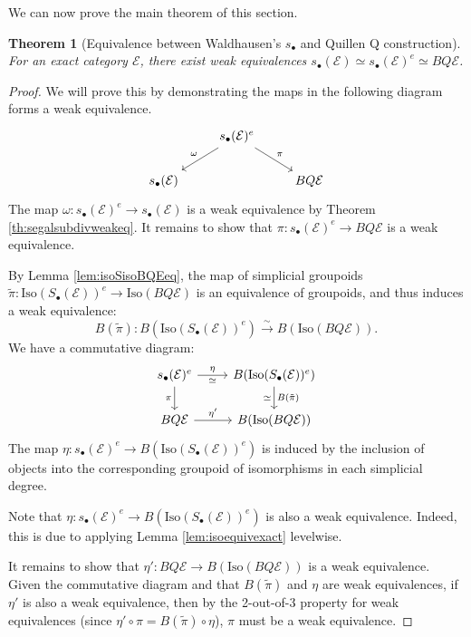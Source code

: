 \documentclass[12pt]{report}
\numberwithin{equation}{section}
\newtheorem{theorem}[dummy]{Theorem}
\begin{document}
	
	We can now prove the main theorem of this section.
	\begin{theorem}[Equivalence between Waldhausen's \( s_\bullet \) and Quillen Q construction]
		For an exact category \( \mathcal{E} \), there exist weak equivalences \( s_\bullet(\mathcal{E}) \simeq s_\bullet(\mathcal{E})^e \simeq BQ \mathcal{E}\).
	\end{theorem}
	\begin{proof}
		We will prove this by demonstrating the maps in the following diagram forms a weak equivalence.
		\[\begin{tikzcd}
			& {s_\bullet(\mathcal{E})^e} \\
			{s_\bullet(\mathcal{E})} && {BQ \mathcal{E}}
			\arrow["\omega"', from=1-2, to=2-1]
			\arrow["\pi", from=1-2, to=2-3]
		\end{tikzcd}\]
		The map $\omega: s_\bullet(\mathcal{E})^e \to s_\bullet(\mathcal{E})$ is a weak equivalence by Theorem \ref{th:segalsubdivweakeq}. It remains to show that $\pi: s_\bullet(\mathcal{E})^e \to BQ\mathcal{E}$ is a weak equivalence.
		
		By Lemma \ref{lem:isoSisoBQEeq}, the map of simplicial groupoids $\tilde{\pi}: \mathrm{Iso}(S_\bullet(\mathcal{E}))^e \to \mathrm{Iso}(BQ\mathcal{E})$ is an equivalence of groupoids, and thus induces a weak equivalence:
		\[ B(\tilde{\pi}) : B(\mathrm{Iso}(S_\bullet(\mathcal{E}))^e) \xrightarrow{\sim} B(\mathrm{Iso}(BQ\mathcal{E})). \]
		We have a commutative diagram:
		\[
		\begin{tikzcd}
			s_\bullet(\mathcal{E})^e \arrow[r, "\eta", "\simeq" swap] \arrow[d, "\pi", swap] & B(\mathrm{Iso}(S_\bullet(\mathcal{E}))^e) \arrow[d, "B(\tilde{\pi})", "\simeq" swap] \\
			BQ\mathcal{E} \arrow[r, "\eta'"] & B(\mathrm{Iso}(BQ\mathcal{E}))
		\end{tikzcd}
		\]
		The map $\eta: s_\bullet(\mathcal{E})^e \to B(\mathrm{Iso}(S_\bullet(\mathcal{E}))^e)$ is induced by the inclusion of objects into the corresponding groupoid of isomorphisms in each simplicial degree. 
		
		Note that $\eta: s_\bullet(\mathcal{E})^e \to B(\mathrm{Iso}(S_\bullet(\mathcal{E}))^e)$ is also a weak equivalence. Indeed, this is due to applying Lemma \ref{lem:isoequivexact} levelwise.
		
		It remains to show that $\eta' : BQ\mathcal{E} \to B(\mathrm{Iso}(BQ\mathcal{E}))$ is a weak equivalence. Given the commutative diagram and that $B(\tilde{\pi})$ and $\eta$ are weak equivalences, if $\eta'$ is also a weak equivalence, then by the 2-out-of-3 property for weak equivalences (since $\eta' \circ \pi = B(\tilde{\pi}) \circ \eta$), $\pi$ must be a weak equivalence.
		

\end{proof}
\end{document}
